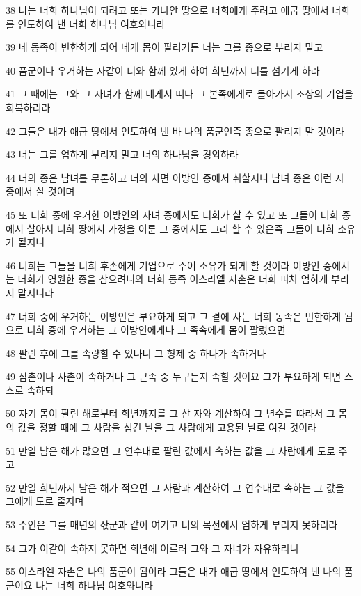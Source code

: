\par 38 나는 너희 하나님이 되려고 또는 가나안 땅으로 너희에게 주려고 애굽 땅에서 너희를 인도하여 낸 너희 하나님 여호와니라
\par 39 네 동족이 빈한하게 되어 네게 몸이 팔리거든 너는 그를 종으로 부리지 말고
\par 40 품군이나 우거하는 자같이 너와 함께 있게 하여 희년까지 너를 섬기게 하라
\par 41 그 때에는 그와 그 자녀가 함께 네게서 떠나 그 본족에게로 돌아가서 조상의 기업을 회복하리라
\par 42 그들은 내가 애굽 땅에서 인도하여 낸 바 나의 품군인즉 종으로 팔리지 말 것이라
\par 43 너는 그를 엄하게 부리지 말고 너의 하나님을 경외하라
\par 44 너의 종은 남녀를 무론하고 너의 사면 이방인 중에서 취할지니 남녀 종은 이런 자 중에서 살 것이며
\par 45 또 너희 중에 우거한 이방인의 자녀 중에서도 너희가 살 수 있고 또 그들이 너희 중에서 살아서 너희 땅에서 가정을 이룬 그 중에서도 그리 할 수 있은즉 그들이 너희 소유가 될지니
\par 46 너희는 그들을 너희 후손에게 기업으로 주어 소유가 되게 할 것이라 이방인 중에서는 너희가 영원한 종을 삼으려니와 너희 동족 이스라엘 자손은 너희 피차 엄하게 부리지 말지니라
\par 47 너희 중에 우거하는 이방인은 부요하게 되고 그 곁에 사는 너희 동족은 빈한하게 됨으로 너희 중에 우거하는 그 이방인에게나 그 족속에게 몸이 팔렸으면
\par 48 팔린 후에 그를 속량할 수 있나니 그 형제 중 하나가 속하거나
\par 49 삼촌이나 사촌이 속하거나 그 근족 중 누구든지 속할 것이요 그가 부요하게 되면 스스로 속하되
\par 50 자기 몸이 팔린 해로부터 희년까지를 그 산 자와 계산하여 그 년수를 따라서 그 몸의 값을 정할 때에 그 사람을 섬긴 날을 그 사람에게 고용된 날로 여길 것이라
\par 51 만일 남은 해가 많으면 그 연수대로 팔린 값에서 속하는 값을 그 사람에게 도로 주고
\par 52 만일 희년까지 남은 해가 적으면 그 사람과 계산하여 그 연수대로 속하는 그 값을 그에게 도로 줄지며
\par 53 주인은 그를 매년의 삯군과 같이 여기고 너의 목전에서 엄하게 부리지 못하리라
\par 54 그가 이같이 속하지 못하면 희년에 이르러 그와 그 자녀가 자유하리니
\par 55 이스라엘 자손은 나의 품군이 됨이라 그들은 내가 애굽 땅에서 인도하여 낸 나의 품군이요 나는 너희 하나님 여호와니라

